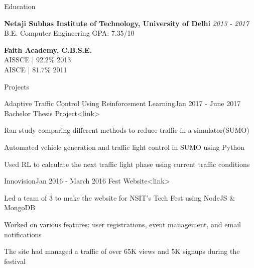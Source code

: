 \documentclass{resume} %
\begin{document}

\begin{rSection}{Education}

    {\bf Netaji Subhas Institute of Technology, University of Delhi} \hfill {\em 2013 - 2017} 
    \\ B.E. Computer Engineering \hfill { GPA: 7.35/10 }

    {\bf Faith Academy, C.B.S.E.} \hfill {\em}
    \\ AISSCE | 92.2\% \hfill { 2013 }
    \\ AISCE | 81.7\% \hfill { 2011 }

\end{rSection}

\begin{rSection}{Projects}

    \begin{rSubsection}{Adaptive Traffic Control Using Reinforcement Learning}{Jan 2017 - June 2017}
    {Bachelor Thesis Project}{<link>}

        \item Ran study comparing different methods to reduce traffic in a simulator(SUMO)
        \item Automated vehicle generation and traffic light control in SUMO using Python
        \item Used RL to calculate the next traffic light phase using current traffic conditions
    \end{rSubsection}

    \begin{rSubsection}{Innovision}{Jan 2016 - March 2016}
    {Fest Website}{<link>}

        \item Led a team of 3 to make the website for NSIT’s Tech Fest using NodeJS \& MongoDB
        \item Worked on various features: user registrations, event management, and email notifications
        \item The site had managed a traffic of over 65K views and 5K signups during the festival
    \end{rSubsection}

\end{rSection}
\end{document}

